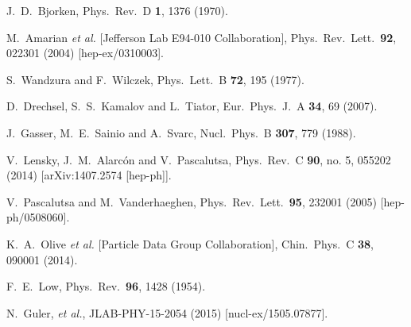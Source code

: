 \documentclass[prc,twocolumn,showpacs,preprintnumbers,amsmath,amssymb
,superscriptaddress,a4paper,nofootinbib
]{revtex4-1}
\begin{document}
\begin{thebibliography}{99}
  J.~D.~Bjorken,
  Phys.\ Rev.\ D {\bf 1}, 1376 (1970).
  
  M.~Amarian {\it et al.}  [Jefferson Lab E94-010 Collaboration],
  Phys.\ Rev.\ Lett.\  {\bf 92}, 022301 (2004)
  [hep-ex/0310003].

  S.~Wandzura and F.~Wilczek,
  Phys.\ Lett.\ B {\bf 72}, 195 (1977).

  D.~Drechsel, S.~S.~Kamalov and L.~Tiator,
  Eur.\ Phys.\ J.\ A {\bf 34}, 69 (2007).
  
J.~Gasser, M.~E.~Sainio and A.~Svarc,
Nucl.\ Phys.\ B {\bf 307}, 779 (1988).

  V.~Lensky, J.~M.~Alarc\'on and V.~Pascalutsa,
  Phys.\ Rev.\ C {\bf 90}, no. 5, 055202 (2014)
  [arXiv:1407.2574 [hep-ph]].
  
  V.~Pascalutsa and M.~Vanderhaeghen,
  Phys.\ Rev.\ Lett.\  {\bf 95}, 232001 (2005)
  [hep-ph/0508060].

  K.~A.~Olive {\it et al.}  [Particle Data Group Collaboration],
  Chin.\ Phys.\ C {\bf 38}, 090001 (2014).

  F.~E.~Low,
  Phys.\ Rev.\  {\bf 96}, 1428 (1954).

N.~Guler, {\it et al.}, 
JLAB-PHY-15-2054 (2015) [nucl-ex/1505.07877].

\end{thebibliography}
\end{document}
